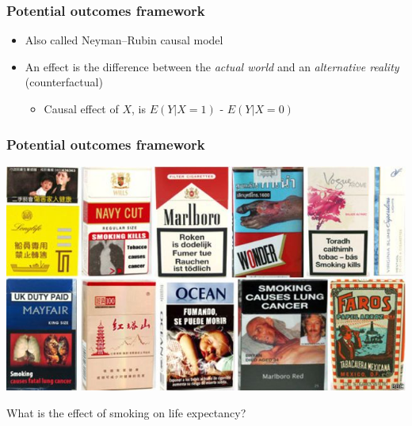 \documentclass[aspectratio=43]{beamer}
\begin{document}
\begin{frame}
\frametitle{Potential outcomes framework}
\centering

\begin{itemize}[<+->]
  \item Also called Neyman–Rubin causal model
  \item An effect is the difference between the \textit{actual world} and an \textit{alternative reality} (counterfactual)
  \begin{itemize}
    \item Causal effect of $X$, is $E(Y|X = 1)$ - $E(Y|X = 0)$
  \end{itemize}
\end{itemize}

\end{frame}

\begin{frame}
\frametitle{Potential outcomes framework}
\centering

\includegraphics[width = 1\textwidth]{../img/tabaco}

\vspace{10pt}

What is the effect of smoking on life expectancy?

\end{frame}
\end{document}

